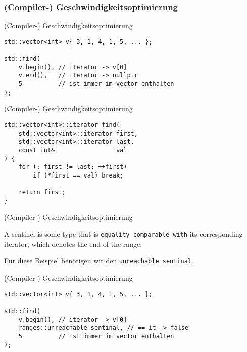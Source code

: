 \subsubsection{(Compiler-) Geschwindigkeitsoptimierung}

\begin{frame}[fragile]{(Compiler-) Geschwindigkeitsoptimierung}
    \begin{verbatim}
std::vector<int> v{ 3, 1, 4, 1, 5, ... };

std::find(
    v.begin(), // iterator -> v[0]
    v.end(),   // iterator -> nullptr
    5          // ist immer im vector enthalten
);
    \end{verbatim}
\end{frame}

\begin{frame}[fragile]{(Compiler-) Geschwindigkeitsoptimierung}
    \begin{verbatim}
std::vector<int>::iterator find(
    std::vector<int>::iterator first,
    std::vector<int>::iterator last,
    const int&                 val
) {
    for (; first != last; ++first)
        if (*first == val) break;
    
    return first;
}
    \end{verbatim}
\end{frame}

\begin{frame}{(Compiler-) Geschwindigkeitsoptimierung}
    \begin{center}
        A sentinel is some type that is \texttt{equality\_comparable\_with} its corresponding iterator, which denotes the end of the range.

        \vspace{2.5em}

        Für diese Beispiel benötigen wir den \texttt{unreachable\_sentinal}.
    \end{center}
\end{frame}

\begin{frame}[fragile]{(Compiler-) Geschwindigkeitsoptimierung}
    \begin{verbatim}
std::vector<int> v{ 3, 1, 4, 1, 5, ... };

std::find(
    v.begin(), // iterator -> v[0]
    ranges::unreachable_sentinal, // == it -> false
    5          // ist immer im vector enthalten
);
    \end{verbatim}
\end{frame}


